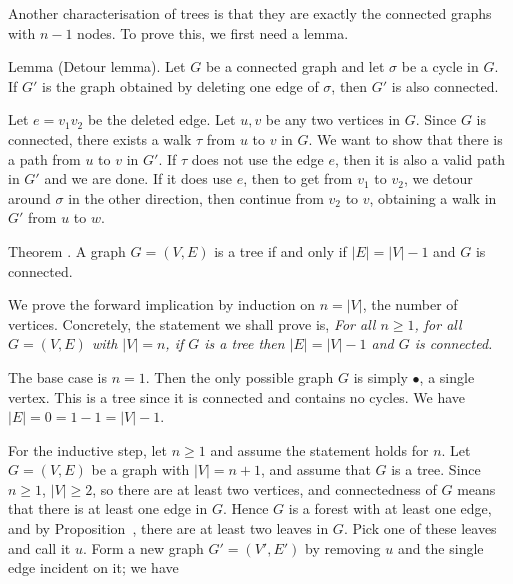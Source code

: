 Another characterisation of trees is that they are exactly the connected graphs with $n-1$
nodes. To prove this, we first need a lemma.

\parenproclaim Lemma {\advthm} (Detour lemma). Let $G$ be a connected graph and let
$\sigma$ be a cycle in $G$. If $G'$ is the graph obtained by deleting one edge
of $\sigma$, then $G'$ is also connected.

\proof Let $e = v_1v_2$ be the deleted edge. Let $u,v$ be any two vertices in $G$.
Since $G$ is connected, there exists a walk $\tau$ from $u$ to $v$ in $G$.
We want to show that there is a path from $u$ to $v$ in $G'$. If $\tau$ does not use
the edge $e$, then it is also a valid path in $G'$ and we are done. If it does use $e$,
then to get from $v_1$ to $v_2$,
we detour around $\sigma$ in the other direction, then continue from $v_2$ to $v$, obtaining
a walk in $G'$ from $u$ to $w$.\slug

\proclaim{} Theorem \advthm. A graph $G = (V,E)$ is a tree if and only if
$|E| = |V|-1$ and $G$ is connected.

\proof We prove the forward implication by induction on $n=|V|$, the number of vertices.
Concretely, the statement we shall prove is, {\sl For all $n\ge 1$, for all $G=(V,E)$ with
$|V| = n$, if $G$ is a tree then $|E| = |V|-1$ and $G$ is connected.}

The base case is $n=1$. Then the only possible graph $G$ is simply $\bullet$, a single vertex.
This is a tree since it is connected and contains no cycles. We have $|E| = 0 = 1-1 = |V|-1$.

For the inductive step, let $n\ge 1$ and assume the statement holds for $n$. Let $G = (V,E)$
be a graph with $|V| = n+1$, and assume that $G$ is a tree. Since $n\ge 1$,
$|V| \ge 2$, so there are at least two vertices, and connectedness of $G$ means that there
is at least one edge in $G$. Hence $G$ is a forest with at least one edge, and by
Proposition~{\proptwoleaves}, there are at least two leaves in $G$. Pick one of these leaves
and call it $u$. Form a new graph $G' = (V', E')$ by removing $u$ and the single edge
incident on it; we have


\bye
